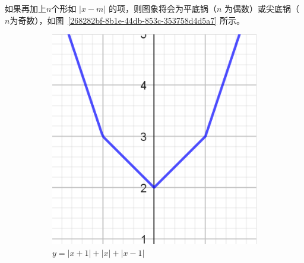 \documentclass[a4paper,openany]{ctexbook}
\begin{document}
如果再加上\(n\)个形如 \(|x-m|\) 的项，则图象将会为平底锅（\(n\) 为偶数）或尖底锅（\(n\)为奇数），如图~\ref{268282bf-8b1e-44db-853c-353758d4d5a7} 所示。

\begin{figure}
    \centering
    \begin{subfigure}{0.45\textwidth}
        \centering
        \includegraphics[width=\textwidth]{image17.png}
        \caption{\(y=|x+1|+|x|+|x-1|\)}
    \end{subfigure}
    \hfill
    \begin{subfigure}{0.45\textwidth}
        \centering

\end{subfigure}
\end{figure}
\end{document}

